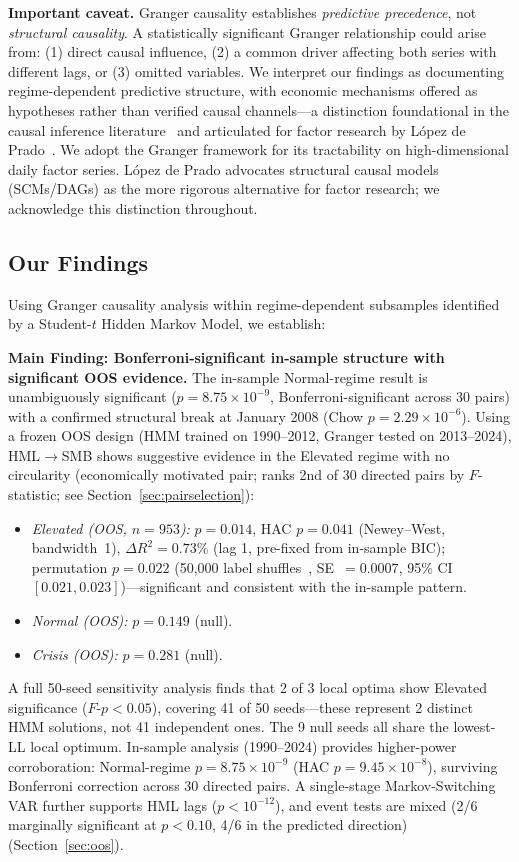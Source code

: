 \documentclass[sigconf,anonymous]{acmart}
\begin{document}
\textbf{Important caveat.} Granger causality establishes \emph{predictive precedence},
not \emph{structural causality}. A statistically significant Granger relationship
could arise from: (1) direct causal influence, (2) a common driver affecting both
series with different lags, or (3) omitted variables. We interpret our findings as documenting regime-dependent predictive structure,
with economic mechanisms offered as hypotheses rather than verified causal channels---a
distinction foundational in the causal inference literature~\cite{pearl2009causality}
and articulated for factor research by L\'opez de Prado~\cite{lopezdeprado2023causal}.
We adopt the Granger framework for its tractability on high-dimensional daily
factor series. L\'opez de Prado advocates structural causal models (SCMs/DAGs)
as the more rigorous alternative for factor research; we acknowledge this
distinction throughout.

\subsection{Our Findings}

Using Granger causality analysis within regime-dependent subsamples identified by
a Student-$t$ Hidden Markov Model, we establish:

\textbf{Main Finding: Bonferroni-significant in-sample structure with significant OOS evidence.}
The in-sample Normal-regime result is unambiguously significant ($p = 8.75 \times 10^{-9}$,
Bonferroni-significant across 30 pairs) with a confirmed structural break at
January 2008 (Chow $p = 2.29\times10^{-6}$).
Using a frozen OOS design (HMM trained on 1990--2012, Granger tested on
2013--2024), HML$\to$SMB shows suggestive evidence in the Elevated regime with no
circularity (economically motivated pair; ranks 2nd of 30 directed pairs by $F$-statistic;
see Section~\ref{sec:pairselection}):
\begin{itemize}
    \item \emph{Elevated (OOS, $n = 953$):} $p = 0.014$, HAC $p = 0.041$ (Newey--West, bandwidth~1),
    $\Delta R^2 = 0.73\%$ (lag 1, pre-fixed from in-sample BIC); permutation $p = 0.022$
    (50{,}000 label shuffles~\cite{good2005permutation}, SE~$= 0.0007$, 95\% CI $[0.021, 0.023]$)---significant
    and consistent with the in-sample pattern.
    \item \emph{Normal (OOS):} $p = 0.149$ (null).
    \item \emph{Crisis (OOS):} $p = 0.281$ (null).
\end{itemize}
A full 50-seed sensitivity analysis finds that 2 of 3 local optima show Elevated
significance ($F$-$p < 0.05$), covering 41 of 50 seeds---these represent 2 distinct
HMM solutions, not 41 independent ones.
The 9 null seeds all share the lowest-LL local optimum.
In-sample analysis (1990--2024) provides higher-power corroboration: Normal-regime
$p = 8.75 \times 10^{-9}$ (HAC $p = 9.45 \times 10^{-8}$), surviving Bonferroni
correction across 30 directed pairs.
A single-stage Markov-Switching VAR further supports HML lags ($p < 10^{-12}$),
and event tests are mixed (2/6 marginally significant at $p < 0.10$, 4/6 in the predicted direction)
(Section~\ref{sec:oos}).
\end{document}
